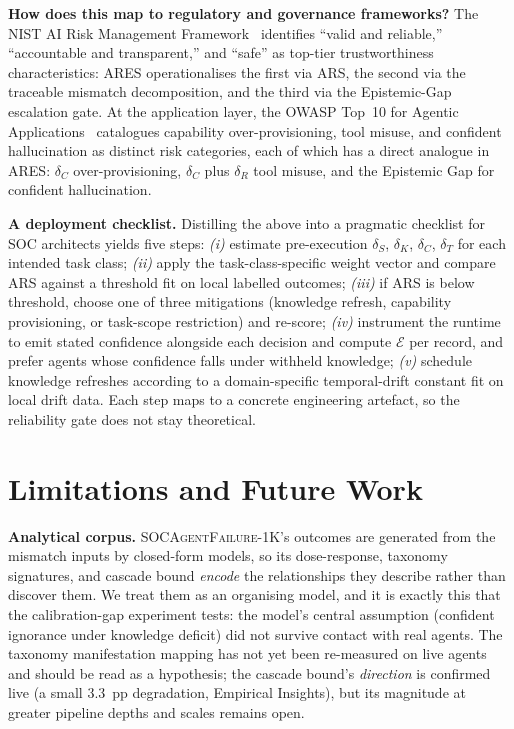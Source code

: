 \documentclass[journal,compsoc]{IEEEtran}
\newcommand{\ARES}{\textsc{ARES}}
\newcommand{\SAFK}{\textsc{SOCAgentFailure-1K}}
\begin{document}
\textbf{How does this map to regulatory and governance frameworks?}
The NIST AI Risk Management
Framework~\cite{nist_ai_rmf} identifies ``valid and reliable,''
``accountable and transparent,'' and ``safe'' as top-tier
trustworthiness characteristics: \ARES{} operationalises the first
via ARS, the second via the traceable mismatch decomposition, and
the third via the Epistemic-Gap escalation gate. At the application layer,
the OWASP Top~10 for Agentic
Applications~\cite{owasp2026agentic} catalogues capability
over-provisioning, tool misuse, and confident hallucination as
distinct risk categories, each of which has a direct analogue in
\ARES{}: $\delta_C$ over-provisioning, $\delta_C$ plus $\delta_R$
tool misuse, and the Epistemic Gap for confident hallucination.

\textbf{A deployment checklist.}
Distilling the above into a pragmatic checklist for SOC
architects yields five steps: \textit{(i)} estimate pre-execution
$\delta_S$, $\delta_K$, $\delta_C$, $\delta_T$ for each intended
task class; \textit{(ii)} apply the task-class-specific weight
vector and compare ARS against a threshold fit on local labelled
outcomes; \textit{(iii)}
if ARS is below threshold, choose one of three mitigations
(knowledge refresh, capability provisioning, or task-scope
restriction) and re-score; \textit{(iv)} instrument the runtime
to emit stated confidence alongside each decision and compute
$\mathcal{E}$ per record, and prefer agents whose confidence
falls under withheld knowledge; \textit{(v)} schedule knowledge
refreshes according to a domain-specific temporal-drift
constant fit on local drift data. Each step maps to a concrete
engineering artefact, so the reliability gate does not stay
theoretical.

\section{Limitations and Future Work}

\textbf{Analytical corpus.} \SAFK{}'s outcomes are generated from the
mismatch inputs by closed-form models, so its dose-response, taxonomy
signatures, and cascade bound \textit{encode} the relationships they
describe rather than discover them. We treat them as an organising
model, and it is exactly this that the calibration-gap experiment tests:
the model's central assumption (confident ignorance under knowledge
deficit) did not survive contact with real agents. The taxonomy
manifestation mapping has not yet been re-measured on live agents and
should be read as a hypothesis; the cascade bound's \emph{direction} is
confirmed live (a small $3.3$~pp degradation, Empirical Insights), but its magnitude at
greater pipeline depths and scales remains open.
\end{document}
